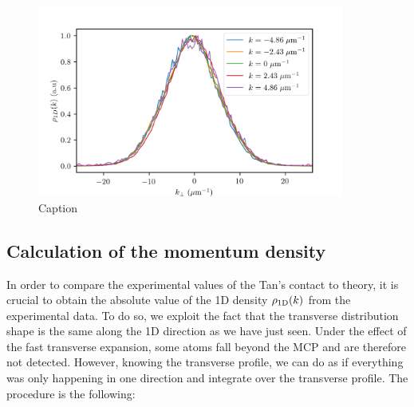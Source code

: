 \begin{figure}
    \centering
    \includegraphics[width=0.9\textwidth]{Fig/Chapter5/1D_transverse_effect.png}
    \caption{Caption}
    \label{fig:1D_transverse}
\end{figure}

\subsection{Calculation of the momentum density}


\label{sec:1D_calculation_momentum_density}

In order to compare the experimental values of the Tan's contact to theory, it is crucial to obtain the absolute value of the 1D density $\rho_{\rm{1D}}(k)$ from the experimental data. To do so, we exploit the fact that the transverse distribution shape is the same along the 1D direction as we have just seen. Under the effect of the fast transverse expansion, some atoms fall beyond the MCP and are therefore not detected. However, knowing the transverse profile, we can do as if everything was only happening in one direction and integrate over the transverse profile. The procedure is the following:

